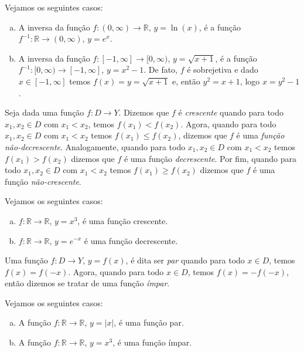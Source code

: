 \begin{ex}
  Vejamos os seguintes casos:
  \begin{enumerate}[a)]
  \item A inversa da função $f:(0, \infty)\to \mathbb{R}$, $y = \ln(x)$, é a função $f^{-1}:\mathbb{R}\to (0, \infty)$, $y = e^{x}$.
  \item A inversa da função $f:[-1, \infty]\to [0, \infty)$, $y = \sqrt{x+1}$, é a função $f^{-1}:[0, \infty)\to [-1, \infty]$, $y = x^2 -1$. De fato, $f$ é sobrejetiva e dado $x\in [-1, \infty]$ temos $f(x) = y = \sqrt{x+1}$ e, então $y^2 = x + 1$, logo $x = y^2 - 1$.
  \end{enumerate}
\end{ex}

\begin{defn}
  Seja dada uma função $f:D\to Y$. Dizemos que $f$ é \emph{crescente} quando para todo $x_1, x_2\in D$ com $x_1 < x_2$, temos $f(x_1) < f(x_2)$. Agora, quando para todo $x_1, x_2 \in D$ com $x_1 < x_2$ temos $f(x_1) \leq f(x_2)$, dizemos que $f$ é uma \emph{função não-decrescente}. Analogamente, quando para todo $x_1, x_2 \in D$ com $x_1 < x_2$ temos $f(x_1) > f(x_2)$ dizemos que $f$ é uma função \emph{decrescente}. Por fim, quando para todo $x_1, x_2 \in D$ com $x_1 < x_2$ temos $f(x_1) \geq f(x_2)$ dizemos que $f$ é uma função \emph{não-crescente}.
\end{defn}

\begin{ex}
  Vejamos os seguintes casos:
  \begin{enumerate}[a)]
  \item $f:\mathbb{R}\to\mathbb{R}$, $y = x^3$, é uma função crescente.
  \item $f:\mathbb{R}\to\mathbb{R}$, $y = e^{-x}$ é uma função decrescente.
  \end{enumerate}
\end{ex}

\begin{defn}
  Uma função $f:D\to Y$, $y = f(x)$, é dita ser \emph{par} quando para todo $x\in D$, temos $f(x) = f(-x)$. Agora, quando para todo $x\in D$, temos $f(x) = -f(-x)$, então dizemos se tratar de uma função \emph{ímpar}.
\end{defn}

\begin{ex}
  Vejamos os seguintes casos:
  \begin{enumerate}[a)]
  \item A função $f:\mathbb{R}\to\mathbb{R}$, $y=|x|$, é uma função par.
  \item A função $f:\mathbb{R}\to\mathbb{R}$, $y=x^3$, é uma função ímpar.
  \end{enumerate}
\end{ex}

